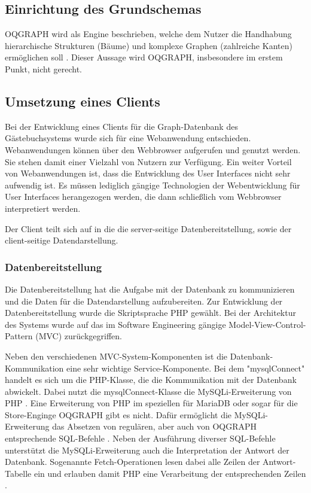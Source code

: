 \subsection{Einrichtung des Grundschemas}
OQGRAPH wird als Engine beschrieben, welche dem Nutzer die Handhabung hierarchische Strukturen (Bäume) und komplexe Graphen (zahlreiche Kanten) ermöglichen soll \cite{oqgraph}. Dieser Aussage wird OQGRAPH, insbesondere im erstem Punkt, nicht gerecht. 



\subsection{Umsetzung eines Clients}
Bei der Entwicklung eines Clients für die Graph-Datenbank des Gästebuchsystems wurde sich für eine Webanwendung entschieden. Webanwendungen können über den Webbrowser aufgerufen und genutzt werden. Sie stehen damit einer Vielzahl von Nutzern zur Verfügung. Ein weiter Vorteil von Webanwendungen ist, dass die Entwicklung des User Interfaces nicht sehr aufwendig ist. Es müssen lediglich gängige Technologien der Webentwicklung für User Interfaces herangezogen werden, die dann schließlich vom Webbrowser interpretiert werden.

Der Client teilt sich auf in die die server-seitige Datenbereitstellung, sowie der client-seitige Datendarstellung.

\subsubsection{Datenbereitstellung}
Die Datenbereitstellung hat die Aufgabe mit der Datenbank zu kommunizieren und die Daten für die Datendarstellung aufzubereiten. Zur Entwicklung der Datenbereitstellung wurde die Skriptsprache PHP gewählt. Bei der Architektur des Systems wurde auf das im Software Engineering gängige Model-View-Control-Pattern (MVC) zurückgegriffen.

Neben den verschiedenen MVC-System-Komponenten ist die Datenbank-Kommunikation eine sehr wichtige Service-Komponente. Bei dem "mysqlConnect" handelt es sich um die PHP-Klasse, die die Kommunikation mit der Datenbank abwickelt. Dabei nutzt die mysqlConnect-Klasse die MySQLi-Erweiterung von PHP \cite{PHP-Mysqli}. Eine Erweiterung von PHP im speziellen für MariaDB oder sogar für die Store-Enginge OQGRAPH gibt es nicht. Dafür ermöglicht die MySQLi-Erweiterung das Absetzen von regulären, aber auch von OQGRAPH entsprechende SQL-Befehle \cite{PHP-Mysqli-Query}. Neben der Ausführung diverser SQL-Befehle unterstützt die MySQLi-Erweiterung auch die Interpretation der Antwort der Datenbank. Sogenannte Fetch-Operationen lesen dabei alle Zeilen der Antwort-Tabelle ein und erlauben damit PHP eine Verarbeitung der entsprechenden Zeilen \cite{PHP-Mysqli-Fetch}.

